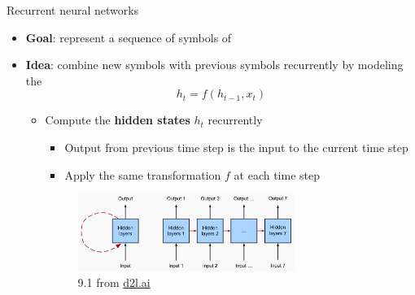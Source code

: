 \documentclass[usenames,dvipsnames,notes,11pt,aspectratio=169,hyperref={colorlinks=true, linkcolor=blue}]{beamer}
\newcommand{\pdfnote}[1]{}
\begin{document}
\begin{frame}
    {Recurrent neural networks}
    \begin{itemize}
        \item \textbf{Goal}: represent a sequence of symbols of 

        \item \textbf{Idea}: combine new symbols with previous symbols {recurrently} by modeling the 
    $$
    h_t = f(h_{t-1}, x_t)
    $$
    \vspace{-1em}
    \pdfnote{
        RNN is a model for sequence data.
        We add a piece of new information at each time step.
    Specifically, we maintain a representation of the current state, which summarizes the context until the current time step.
    To compute the current state, we take the previous state and combine it with the new input.
    }

    \pause
    \begin{itemize}
        \item Compute the \textbf{hidden states} $h_t$ recurrently
            \begin{itemize}
            \item Output from previous time step is the input to the current time step
            \item Apply the same transformation $f$ at each time step
            \end{itemize}
    \begin{figure}
        \includegraphics[height=2.5cm]{figures/rnn-concept}
        \caption{9.1 from \href{https://d2l.ai/chapter_recurrent-neural-networks}{d2l.ai}}
    \end{figure}
    \end{itemize}
    \end{itemize}

\end{frame}
\end{document}
